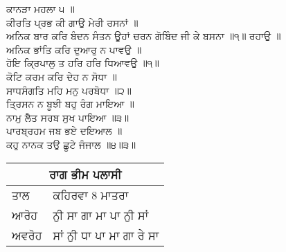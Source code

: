 \documentclass[10pt]{article}
\begin{document}
\begin{flushleft}
{\large{\textsf {ਕਾਨੜਾ ਮਹਲਾ ੫ ॥} \\[0.2in]

ਕੀਰਤਿ ਪ੍ਰਭ ਕੀ ਗਾਉ ਮੇਰੀ ਰਸਨਾਂ ॥ \\
ਅਨਿਕ ਬਾਰ ਕਰਿ ਬੰਦਨ ਸੰਤਨ ਊਹਾਂ ਚਰਨ ਗੋਬਿੰਦ ਜੀ ਕੇ ਬਸਨਾ ॥੧॥ ਰਹਾਉ ॥ \\ [0.1in]

ਅਨਿਕ ਭਾਂਤਿ ਕਰਿ ਦੁਆਰੁ ਨ ਪਾਵਉ ॥ \\
ਹੋਇ ਕ੍ਰਿਪਾਲੁ ਤ ਹਰਿ ਹਰਿ ਧਿਆਵਉ ॥੧॥ \\ [0.1in]

ਕੋਟਿ ਕਰਮ ਕਰਿ ਦੇਹ ਨ ਸੋਧਾ ॥ \\
ਸਾਧਸੰਗਤਿ ਮਹਿ ਮਨੁ ਪਰਬੋਧਾ ॥੨॥ \\  [0.1in]

ਤ੍ਰਿਸਨ ਨ ਬੂਝੀ ਬਹੁ ਰੰਗ ਮਾਇਆ ॥ \\
ਨਾਮੁ ਲੈਤ ਸਰਬ ਸੁਖ ਪਾਇਆ ॥੩॥ \\  [0.1in]

ਪਾਰਬ੍ਰਹਮ ਜਬ ਭਏ ਦਇਆਲ ॥ \\
ਕਹੁ ਨਾਨਕ ਤਉ ਛੂਟੇ ਜੰਜਾਲ ॥੪॥੩॥ \\ [0.1in]
}}
\end{flushleft}


\begin{table}[!htb]
 {\renewcommand{\arraystretch}{1.5}%
\begin{tabular}{|l|p{10cm}|}
\hline
\multicolumn{2}{|c|}{\large{\textsf {ਰਾਗ ਭੀਮ ਪਲਾਸੀ}}} \\ \hline
\textsf {ਤਾਲ}     & ਕਹਿਰਵਾ 8 ਮਾਤਰਾ            \\ \hline
\textsf{ਆਰੋਹ}   & ਨੁੀ ਸਾ ਗਾ ਮਾ ਪਾ ਨੁੀ ਸਾਂ   \\ \hline
\textsf{ਅਵਰੋਹ}  & ਸਾਂ ਨੁੀ ਧਾ ਪਾ ਮਾ ਗਾ ਰੇ ਸਾ \\ \hline
\end{tabular} } \quad
\end{table}
\end{document}
